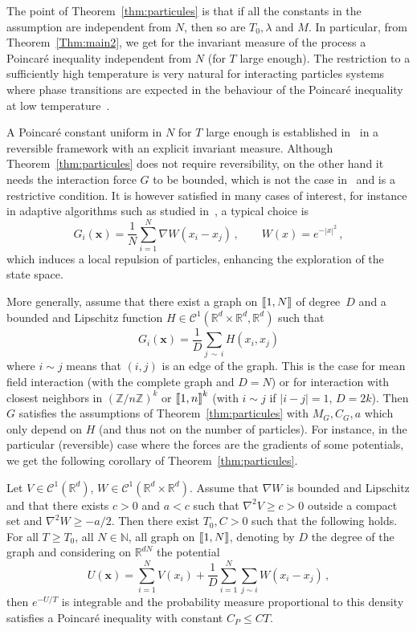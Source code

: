 \documentclass[AHL,Unicode,longabstracts,published]{cedram}
\newcommand{\llbracket}{\mathopen{[\mkern -2.7mu[}}
\newcommand{\rrbracket}{\mathclose{]\mkern -2.7mu]}}
\newcommand{\R}{\mathbb R}
\newcommand{\Z}{\mathbb Z}
\newcommand{\clC}{\mathcal C}
\newcommand{\N}{\mathbb N}
\newcommand{\na}{\nabla}
\newcommand{\1}{\mathbbm{1}}
\newcommand{\bx}{\mathbf{x}}
\newcommand{\R}{\mathbb R}
\begin{document}
The point of Theorem~\ref{thm:particules} is that if all the constants in the assumption are independent from $N$, then so are $T_0,\lambda$ and $M$. In particular, from Theorem~\ref{Thm:main2}, we get for the invariant measure of the process a Poincaré inequality independent from $N$ (for $T$ large enough). The restriction to a sufficiently high temperature is very natural for interacting particles systems where phase transitions are expected in the behaviour of the Poincaré inequality at low temperature~\cite{Tugaut2014}.


A Poincaré constant uniform in $N$ for $T$ large enough is established in~\cite{GuillinWuZhang} in a reversible framework with an explicit invariant measure. Although Theorem~\ref{thm:particules} does not require reversibility, on the other hand it needs the interaction force $G$ to be bounded, which is not the case in~\cite{GuillinWuZhang} and is a restrictive condition. It is however satisfied in many cases of interest, for instance in adaptive algorithms such as studied in~\cite{Clubdes5}, a typical choice is
\[
G_i(\bx) = \frac1N \sum_{i=1}^N \na W\left(x_i-x_j\right)\,,\qquad W(x) = e^{-|x|^2}\,,
\]
which induces a local repulsion of particles, enhancing the exploration of the state space.

More generally, assume that there exist a graph on $\llbracket 1,N\rrbracket$ of degree~$D$ and a bounded and Lipschitz function $H\in \clC^1(\R^d\times\R^d,\R^d)$ such that
\[
G_i(\bx) = \frac{1}{D}\sum_{j\,\sim\,i} H\left(x_i,x_j\right)
\]
where $i\sim j$ means that $(i,j)$ is an edge of the graph. This is the case for mean field interaction (with the complete graph and $D=N$) or for interaction with closest neighbors in $(\Z/n\Z)^k$ or $\llbracket 1,n\rrbracket^k$ (with $i\sim j$ if $|i-j|=1$, $D=2k$). Then $G$ satisfies the assumptions of Theorem~\ref{thm:particules} with $M_G,C_G,a$ which only depend on $H$ (and thus not on the number of particles). For instance, in the particular (reversible) case where the forces are the gradients of some potentials, we get the following corollary of Theorem~\ref{thm:particules}.


\begin{prop}
Let $V\in\clC^1(\R^d)$, $W\in\clC^1(\R^d\times\R^d)$. Assume that $\na W$ is bounded and Lipschitz and that there exists $c>0$ and $a<c$ such that $\na^2 V \geqslant c>0$ outside a compact set and $\na^2 W \geqslant -a/2$. Then there exist $T_0,C> 0$ such that the following holds. For all $T\geqslant T_0$, all $N\in\N$, all graph on $\llbracket 1,N\rrbracket$, denoting by $D$ the degree of the graph and considering on $\R^{dN}$ the potential
\[
U(\bx) = \sum_{i=1}^N V(x_i) + \frac{1}{D}\sum_{i=1}^N\sum_{j\sim i} W\left(x_i-x_j\right)\,,
\]
then $e^{-U/T}$ is integrable and the probability measure proportional to this density satisfies a Poincaré inequality with constant $C_P\leqslant CT$.
\end{prop}
\end{document}
